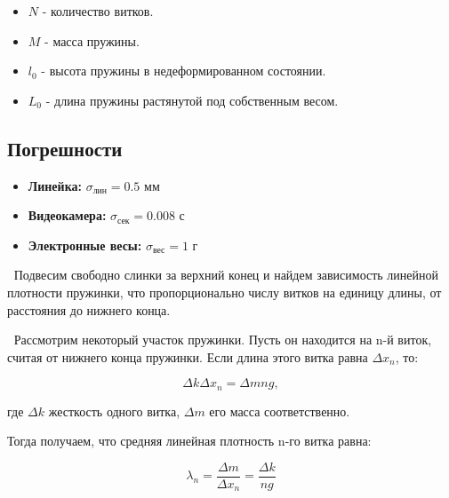 \documentclass[a4paper, 12pt]{article}
\begin{document}
\begin{itemize}
    \item $ N $ - количество витков. 
    \item $ M $ - масса пружины. 
    \item $ l_{0} $ - высота пружины в недеформированном состоянии.
    \item $ L_{0} $ - длина пружины растянутой под собственным весом.
\end{itemize}

\begin{center}    
\subsection*{Погрешности}
\end{center}

\begin{itemize}
	\item \textbf{Линейка:} $ \sigma_\text{лин} = 0.5 $ мм
	\item \textbf{Видеокамера:} $ \sigma_\text{сек} = 0.008 $ с
	\item \textbf{Электронные весы:} $ \sigma_\text{вес} = 1 $ г
\end{itemize}

$\>$ Подвесим свободно слинки за верхний конец и найдем зависимость линейной плотности пружинки, что пропорционально числу витков на единицу длины,
от расстояния до нижнего конца. 

\bigskip

$\>$ Рассмотрим некоторый участок пружинки. Пусть он находится на n-й виток,
считая от нижнего конца пружинки. Если длина этого витка равна $\varDelta x_{n}$, то:

\begin{equation}
    \varDelta k \varDelta x_{n} = \varDelta m n g,    
\end{equation}

\bigskip

где $\varDelta k$ жесткость одного витка, $\varDelta m $ его масса соответственно.

\bigskip

Тогда получаем, что средняя линейная плотность n-го витка равна:

\bigskip

\begin{equation}
    \lambda_{n} = \frac{\varDelta m}{\varDelta x_{n}} = \frac{\varDelta k}{ng}
\end{equation}
\end{document}
